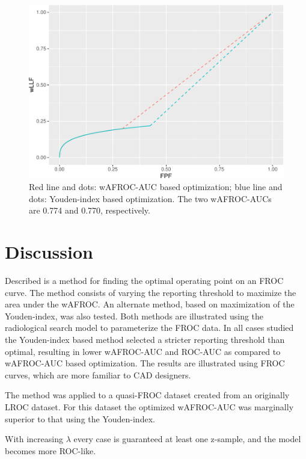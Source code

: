 \documentclass[
]{book}
\begin{document}
\begin{figure}
\centering
\includegraphics{21-optim-op-point_files/figure-latex/optim-op-point-application-wafroc-1.pdf}
\caption{\label{fig:optim-op-point-application-wafroc}Red line and dots: wAFROC-AUC based optimization; blue line and dots: Youden-index based optimization. The two wAFROC-AUCs are 0.774 and 0.770, respectively.}
\end{figure}

\hypertarget{optim-op-point-discussion}{%
\section{Discussion}\label{optim-op-point-discussion}}

Described is a method for finding the optimal operating point on an FROC curve. The method consists of varying the reporting threshold to maximize the area under the wAFROC. An alternate method, based on maximization of the Youden-index, was also tested. Both methods are illustrated using the radiological search model to parameterize the FROC data. In all cases studied the Youden-index based method selected a stricter reporting threshold than optimal, resulting in lower wAFROC-AUC and ROC-AUC as compared to wAFROC-AUC based optimization. The results are illustrated using FROC curves, which are more familiar to CAD designers.

The method was applied to a quasi-FROC dataset created from an originally LROC dataset. For this dataset the optimized wAFROC-AUC was marginally superior to that using the Youden-index.

With increasing \(\lambda\) every case is guaranteed at least one z-sample, and the model becomes more ROC-like.
\end{document}
